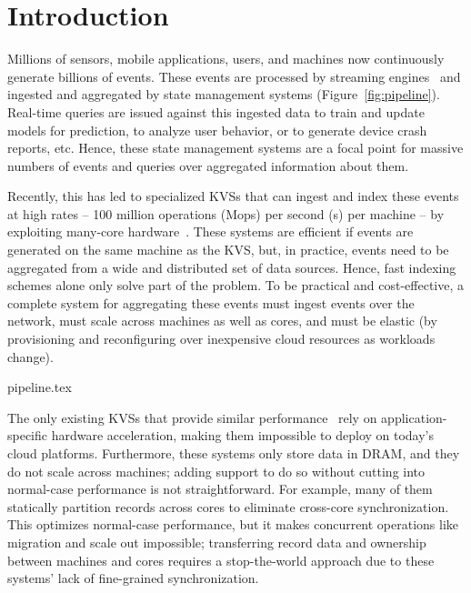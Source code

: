 \section{Introduction}


Millions of sensors, mobile applications, users, and machines now
continuously generate billions of events.
%
These events are processed by streaming
engines~\cite{spark-streaming,trill} and ingested and aggregated
by state management systems (Figure~\ref{fig:pipeline}).
%
Real-time queries are issued against this ingested data to train and
update models for prediction, to analyze user behavior, or to generate
device crash reports, etc.
%
Hence, these state management systems are a focal point for massive numbers of
events and queries over aggregated information about them.

Recently, this has led to specialized KVSs that can
ingest and index these events at high rates -- 100 million operations (Mops) per second (s) per machine -- by
exploiting many-core hardware~\cite{faster,anna}.
%
These systems are efficient if events are generated on the same machine as
the KVS, but, in practice, events need to be aggregated from a wide
and distributed set of data sources.
%
Hence, fast indexing schemes alone only solve part of the problem.
%
To be practical and cost-effective, a complete system for aggregating these
events must ingest events over the network, must scale across machines as
well as cores, and must be elastic (by provisioning and reconfiguring over
inexpensive cloud resources as workloads change).

 {pipeline.tex}

The only existing KVSs that provide similar
performance~\cite{mica,flexnic,floem,kvdirect} rely on application-specific
hardware acceleration, making them impossible to deploy on today's cloud
platforms.
%
Furthermore, these systems only store data in DRAM, and they do not scale across
machines; adding support to do so without cutting into normal-case performance
is not straightforward.
%
For example, many of them statically partition records across cores to
eliminate cross-core synchronization.
%
This optimizes normal-case performance, but it makes concurrent
operations like migration and scale out impossible; transferring record data
and ownership between machines and cores requires a stop-the-world approach
due to these systems' lack of fine-grained synchronization.


